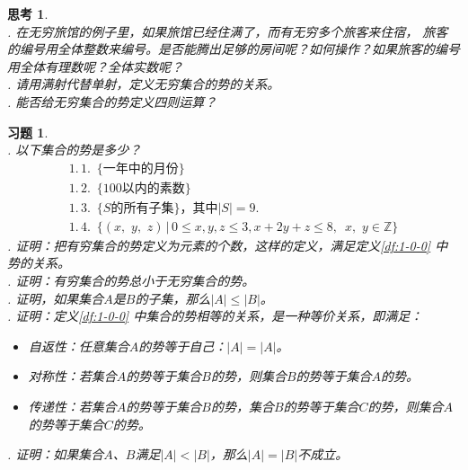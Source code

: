\documentclass[12pt,UTF8]{ctexbook}
\newtheorem{sk}{思考}[section]
\newtheorem{xt}{习题}[section]
\begin{document}
\begin{sk}
    \mbox{} \\
    . 在无穷旅馆的例子里，如果旅馆已经住满了，而有无穷多个旅客来住宿，
    旅客的编号用全体整数来编号。是否能腾出足够的房间呢？如何操作？如果旅客的编号用全体有理数呢？全体实数呢？\\
    . 请用满射代替单射，定义无穷集合的势的关系。\\
    . 能否给无穷集合的势定义四则运算？
\end{sk}


\begin{xt}
    \mbox{} \\
    . 以下集合的势是多少？
    $$ 
    \begin{array}{l}
        1.\,1. \,\,\,\{\mbox{一年中的月份}\} \\
        1.\,2. \,\,\,\{100\mbox{以内的素数}\}\\
        1.\,3. \,\,\,\{S\mbox{的所有子集}\}\mbox{，其中}|S| = 9. \\
        1.\,4. \,\,\,\{(x, \,\, y, \,\, z) \, | \, 0 \leqslant x, y, z \leqslant 3, x + 2y + z \leqslant 8,\,\,\, x,\,\, y \in  \mathbb{Z}\}
    \end{array}
    $$
    . 证明：把有穷集合的势定义为元素的个数，这样的定义，满足定义\ref{df:1-0-0} 中势的关系。\\
    . 证明：有穷集合的势总小于无穷集合的势。\\
    . 证明，如果集合$A$是$B$的子集，那么$|A| \leqslant |B|$。\\
    . 证明：定义\ref{df:1-0-0} 中集合的势相等的关系，是一种等价关系，即满足：
    \indent \begin{itemize}
        \item 自返性：任意集合$A$的势等于自己：$|A| = |A|$。
        \item 对称性：若集合$A$的势等于集合$B$的势，则集合$B$的势等于集合$A$的势。
        \item 传递性：若集合$A$的势等于集合$B$的势，集合$B$的势等于集合$C$的势，则集合$A$的势等于集合$C$的势。
    \end{itemize}

    . 证明：如果集合$A$、$B$满足$|A| < |B|$，那么$|A| = |B|$不成立。



\end{xt}
\end{document}
